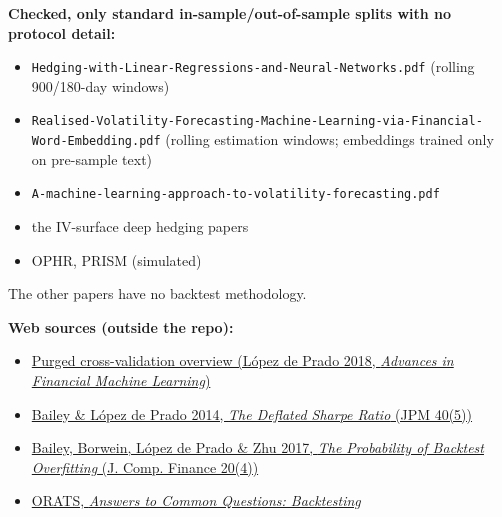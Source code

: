 \documentclass{article}
\begin{document}
\textbf{Checked, only standard in-sample/\allowbreak{}out-of-sample splits with no protocol detail:}

\begin{itemize}

\item \texttt{Hedging-\allowbreak{}with-\allowbreak{}Linear-\allowbreak{}Regressions-\allowbreak{}and-\allowbreak{}Neural-\allowbreak{}Networks.\allowbreak{}pdf} (rolling 900/\allowbreak{}180-day windows)

\item \texttt{Realised-\allowbreak{}Volatility-\allowbreak{}Forecasting-\allowbreak{}Machine-\allowbreak{}Learning-\allowbreak{}via-\allowbreak{}Financial-\allowbreak{}Word-\allowbreak{}Embedding.\allowbreak{}pdf} (rolling estimation windows; embeddings trained only on pre-sample text)

\item \texttt{A-\allowbreak{}machine-\allowbreak{}learning-\allowbreak{}approach-\allowbreak{}to-\allowbreak{}volatility-\allowbreak{}forecasting.\allowbreak{}pdf}

\item the IV-surface deep hedging papers

\item OPHR, PRISM (simulated)

\end{itemize}

The other papers have no backtest methodology.

\textbf{Web sources (outside the repo):}

\begin{itemize}

\item \href{https://en.wikipedia.org/wiki/Purged_cross-validation}{Purged cross-validation overview (López de Prado 2018, \emph{Advances in Financial Machine Learning})}

\item \href{https://jpm.pm-research.com/content/40/5/94.abstract}{Bailey \& López de Prado 2014, \emph{The Deflated Sharpe Ratio} (JPM 40(5))}

\item \href{https://www.risk.net/journal-of-computational-finance/2471206/the-probability-of-backtest-overfitting}{Bailey, Borwein, López de Prado \& Zhu 2017, \emph{The Probability of Backtest Overfitting} (J. Comp. Finance 20(4))}

\item \href{https://orats.com/blog/answers-to-common-questions-backtesting}{ORATS, \emph{Answers to Common Questions: Backtesting}}

\end{itemize}
\end{document}
